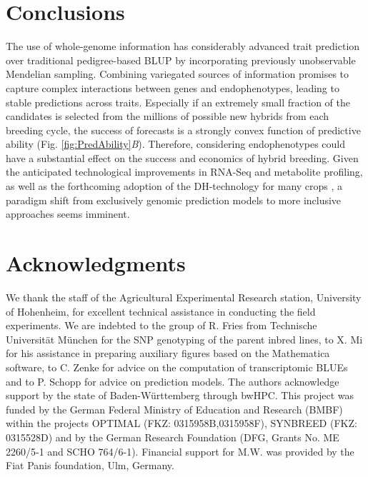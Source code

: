 \documentclass[12pt,titlepage]{article}
\begin{document}
\section*{Conclusions}
The use of whole-genome information has considerably advanced trait prediction
over traditional pedigree-based BLUP by incorporating previously unobservable 
Mendelian sampling.
Combining variegated sources of information promises to capture complex
interactions between genes and endophenotypes, leading to stable predictions
across traits.
Especially if an extremely small fraction of the candidates is selected from
the millions of possible new hybrids from each breeding cycle, the success of
forecasts is a strongly convex function of predictive ability
(Fig. \ref{fig:PredAbility}\textit{B}).
Therefore, considering endophenotypes could have a substantial effect on the 
success and economics of hybrid breeding.
Given the anticipated technological improvements in RNA-Seq and metabolite 
profiling, as well as the forthcoming adoption of the DH-technology for many
crops \cite{Kelliher2017}, a paradigm shift from exclusively genomic prediction 
models to more inclusive approaches seems imminent.





\section{Acknowledgments} 
We thank the staff of the Agricultural Experimental Research station,
University of Hohenheim, for excellent technical assistance in
conducting the field experiments. We are indebted to the group of R.
Fries from Technische Universit{\"a}t M{\"u}nchen for the SNP genotyping of the
parent inbred lines, to X. Mi for his assistance in preparing auxiliary
figures based on the Mathematica software, to C. Zenke for advice on the
computation of transcriptomic BLUEs and to P. Schopp for advice on
prediction models. The authors acknowledge support by the state of
Baden-W{\"u}rttemberg through bwHPC. This project was funded by the German
Federal Ministry of Education and Research (BMBF) within the projects
OPTIMAL (FKZ: 0315958B,0315958F), SYNBREED (FKZ: 0315528D) and by the
German Research Foundation (DFG, Grants No. ME 2260/5-1 and SCHO 764/6-1).
Financial support for M.W. was provided by the Fiat Panis foundation, Ulm,
Germany.



\nolinenumbers


\end{document}
